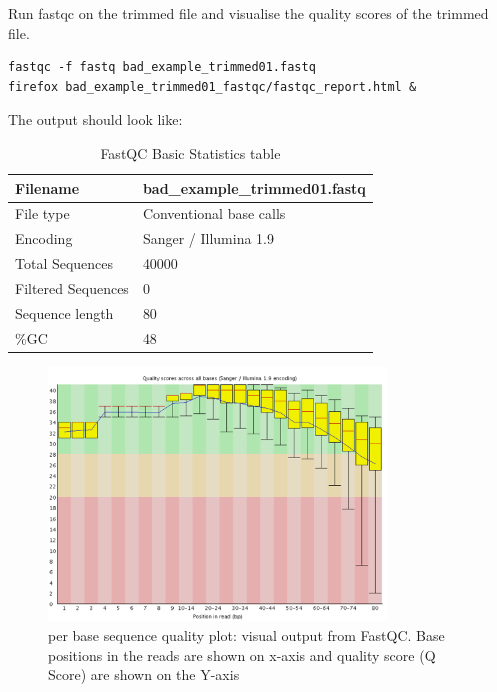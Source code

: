 \begin{steps}
Run fastqc on the trimmed file and visualise the quality scores of the trimmed file.
\begin{lstlisting}
fastqc -f fastq bad_example_trimmed01.fastq
firefox bad_example_trimmed01_fastqc/fastqc_report.html &
\end{lstlisting}

The output should look like:

\begin{table}[htbp]
  \centering
  \caption{FastQC Basic Statistics table}
    \begin{tabular}{ll}
    \toprule
    Filename & bad\_example\_trimmed01.fastq \\
    \midrule
    File type & Conventional base calls \\
    Encoding & Sanger / Illumina 1.9 \\
    Total Sequences & 40000 \\
    Filtered Sequences & 0 \\
    Sequence length & 80 \\
    \%GC  & 48 \\
    \bottomrule
    \end{tabular}%
  \label{tab:badexampletrimmed}%
\end{table}%

\begin{figure}[htb]
\centering
\includegraphics[width=0.8\textwidth]{ngs-qc/bad_example_trimmed_to_80bp.png}
\caption{per base sequence quality plot: visual output from FastQC. Base positions in the reads are shown on x-axis and quality score (Q Score) are shown on the Y-axis}
\label{fig:bad_example_trimmed_plot}
\end{figure}

\end{steps}

